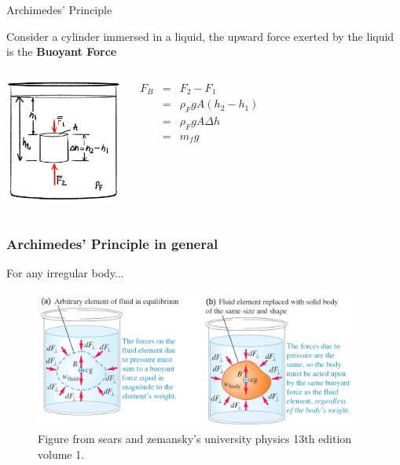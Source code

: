 \documentclass[]{beamer}
\begin{document}
\begin{frame}
  \textcolor{mypink1}{Archimedes' Principle}

  \vspace{5mm}
Consider a cylinder immersed in a liquid, the upward force exerted by the liquid is the \textbf{Buoyant Force}

\vspace{5mm}

\begin{columns}[c]
  \column{2in}  %
    \begin{center}
  \includegraphics[height=1.6in]{images2/Buoyance.jpg}
\end{center}

  \column{2in}
    \begin{eqnarray*}
      F_B&=&F_2-F_1\\
      &=&\rho_F g A (h_2-h_1)\\
      &=&\rho_F g A \Delta h\\
      &=&m_f g
    \end{eqnarray*}
  \end{columns}
\end{frame}

    


\begin{frame}
\frametitle{Archimedes' Principle in general }
For any irregular body...

  \begin{figure}
    \begin{center}
      \includegraphics[height=1.8in]{images2/Buoyance2b.jpg}
    \end{center}
    \caption{Figure from sears and zemansky's university physics 13th edition volume 1.}
  \end{figure}


  \end{frame}
\end{document}
